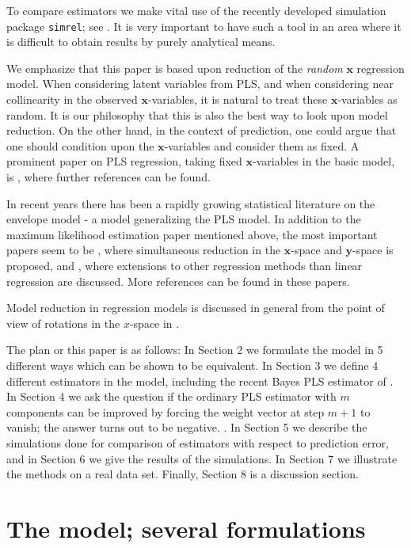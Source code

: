 \documentclass[num-refs]{wiley-article}
\begin{document}
To compare estimators we make vital use of the recently developed simulation package {\tt simrel}; see \citet{saebo2015simrel}. It is very important to have such a tool in an area where it is difficult to obtain results by purely analytical means.

We emphasize that this paper is based upon reduction of the \emph{random} $\bm{x}$ regression model. When considering latent variables from PLS, and when considering near collinearity in the observed $\bm{x}$-variables, it is natural to treat these $\bm{x}$-variables as random. It is our philosophy that this is also the best way to look upon model reduction. On the other hand, in the context of prediction, one could argue that one should condition upon the $\bm{x}$-variables and consider them as fixed. A prominent paper on PLS regression, taking fixed $\bm{x}$-variables in the basic model, is \citet{kramer2012degrees}, where further references can be found.

In recent years there has been a rapidly growing statistical literature on the envelope model - a model generalizing the PLS model. In addition to the maximum likelihood estimation paper mentioned above, the most important papers seem to be \citet{cook2015simultaneous}, where simultaneous reduction in the $\bm{x}$-space and $\bm{y}$-space is proposed, and \citet{cook2015foundations}, where extensions to other regression methods than linear regression are discussed. More references can be found in these papers.

Model reduction in regression models is discussed in general from the point of view of rotations in the $x$-space in \citep{helland2001reduction}.

The plan or this paper is as follows: In Section 2 we formulate the model in 5 different ways which can be shown to be equivalent. In Section 3 we define 4 different estimators in the model, including the recent Bayes PLS estimator of \citet{helland2012near}. In Section 4 we ask the question if the ordinary PLS estimator with $m$ components can be improved by forcing the weight vector at step $m+1$ to vanish; the answer turns out to be negative. . In Section 5 we describe the simulations done for comparison of estimators with respect to prediction error, and in Section 6 we give the results of the simulations. In Section 7 we illustrate the methods on a real data set. Finally, Section 8 is a discussion section.

\section{The model; several formulations}
\end{document}
